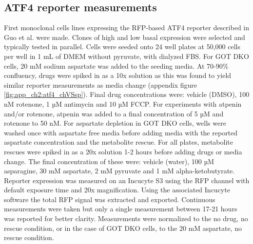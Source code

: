 \subsection{ATF4 reporter measurements}
First monoclonal cells lines expressing the RFP-based ATF4 reporter described in Guo et al. \cite{Guo2020-ia} were made.
Clones of high and low basal expression were selected and typically tested in parallel.
Cells were seeded onto 24 well plates at 50,000 cells per well in 1 mL of DMEM without pyruvate, with dialyzed FBS.
For GOT DKO cells, 20 mM sodium aspartate was added to the seeding media.
At 70-90\% confluency, drugs were spiked in as a 10x solution as this was found to yield similar reporter measurements as media change (appendix figure \ref{fig:app_ch2:atf4_chVSsp}).
Final drug concentrations were: vehicle (DMSO), 100 nM rotenone, 1 µM antimycin and 10 µM FCCP.
For experiments with atpenin and/or rotenone, atpenin was added to a final concentration of 5 µM and rotenone to 50 nM.
For aspartate depletion in GOT DKO cells, wells were washed once with aspartate free media before adding media with the reported aspartate concentration and the metabolite rescue.
For all plates, metabolite rescues were spiked in as a 20x solution 1-2 hours before adding drugs or media change.
The final concentration of these were: vehicle (water), 100 µM asparagine, 30 mM aspartate, 2 mM pyruvate and 1 mM alpha-ketobutyrate.
Reporter expression was measured on an Incucyte S3 using the RFP channel with default exposure time and 20x magnification.
Using the associated Incucyte software the total RFP signal was extracted and exported.
Continuous measurements were taken but only a single measurement between 17-21 hours was reported for better clarity.
Measurements were normalized to the no drug, no rescue condition, or in the case of GOT DKO cells, to the 20 mM aspartate, no rescue condition.


